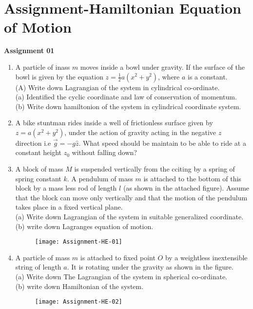 \chapter{Assignment-Hamiltonian Equation of Motion}
\textbf{Assignment 01}
\begin{enumerate}
	\item A particle of inass $m$ moves inside a bowl under gravity. If the surface of the bowl is given by the equation $z=\frac{1}{2} a\left(x^{2}+y^{2}\right)$, where $a$ is a constant.\\
	(A) Write down Lagrangian of the system in cylindrical co-ordinate.\\
	(a) Identified the cyclic coordinate and law of conservation of momentum.\\
	(b) Write down hamiltonion of the system in cylindrical coordinate system.
	 \item A bike stuntman rides inside a well of frictionless surface given by $z=a\left(x^{2}+y^{2}\right)$, under the action of gravity acting in the negative $z$ direction i.e $\vec{g}=-g \hat{z}$. What speed should be maintain to be able to ride at a constant height $z_{0}$ without falling down?
	 \item A block of mass $M$ is suspended vertically from the cciting by a spring of spring constant $k$. A pendulum of mass $m$ is attached to the bottom of this block by a mass less rod of length $l$ (as shown in the attached figure). Assume that the block can move only vertically and that the motion of the pendulum takes place in a fixed vertical plane.\\
	 (a) Write down Lagrangian of the system in suitable generalized coordinate.\\
	 (b) write down Lagranges equation of motion.
	 \begin{figure}[H]
	 	\centering
	 	\texttt{[image: Assignment-HE-01]}
	 \end{figure}
	 \item A particle of mass $m$ is attached to fixed point $O$ by a weightless inextensible string of length $a$. It is rotating under the gravity as shown in the figure.\\
	 (a) Write down The Lagrangian of the system in spherical co-ordinate.\\
	 (b) write down Hamiltonian of the system.
	  \begin{figure}[H]
	 	\centering
	 	\texttt{[image: Assignment-HE-02]}
	 \end{figure}

\end{enumerate}
